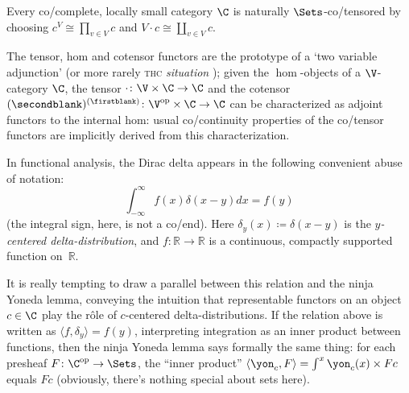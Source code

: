 \begin{example}
Every co/complete, locally small category $\C$ is naturally $\Sets$-co/tensored by choosing $c^V\cong \prod_{v\in V}c$ and $V\cdot c\cong \coprod_{v\in V}c$.
\end{example}
\begin{remark}\label{cocotens}
The tensor, hom and cotensor functors are the prototype of a `two variable adjunction' (or more rarely \textsc{thc} \emph{situation} \cite[\S \textbf{1.1}]{Gray1980}); given the $\hom$-objects of a $\V$-category $\C$, the tensor $\cdot\colon \V\times \C\to \C$ and the cotensor $(\secondblank)^{(\firstblank)}\colon \V^\text{op}\times \C\to \C$ can be characterized as adjoint functors to the internal hom: usual co/continuity properties of the co/tensor functors are implicitly derived from this characterization.
\end{remark}
\begin{remark}\label{dirac}
In functional analysis, the Dirac delta appears in the following convenient abuse of notation:
\[
\int_{-\infty}^\infty f(x) \delta(x-y)dx = f(y)
\]
(the integral sign, here, is not a co/end). Here $\delta_y(x)  \coloneqq \delta(x-y)$ is the \emph{$y$-centered delta-distribution}, and $f\colon \mathbb{R}\to \mathbb{R}$ is a continuous, compactly supported function on~$\mathbb{R}$.

It is really tempting to draw a parallel between this relation and the ninja Yoneda lemma, conveying the intuition that representable functors on an object $c\in\C$ play the r\^ole of $c$-centered delta-distributions. If the relation above is written as $\langle f,\delta_y\rangle = f(y)$, interpreting integration as an inner product between functions, then the ninja Yoneda lemma says formally the same thing: for each presheaf $F\colon \C^\text{op} \to \Sets$, the ``inner product'' $\langle \yon_c, F\rangle = \int^x \yon_c(x)\times Fc$ equals $Fc$ (obviously, there's nothing special about sets here).
\end{remark}
